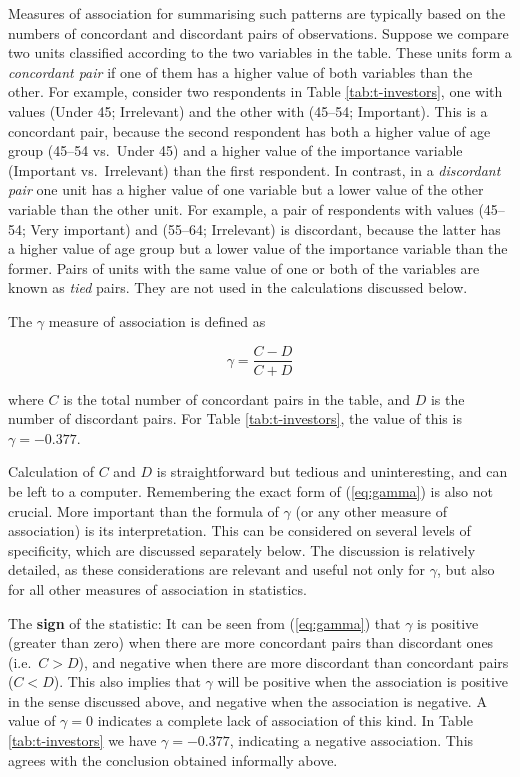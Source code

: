 \documentclass[11pt,a4paper,openany]{book}
\begin{document}
Measures of association for summarising such patterns are typically
based on the numbers of concordant and discordant pairs of observations.
Suppose we compare two units classified according to the two variables
in the table. These units form a \emph{concordant pair} if one of them
has a higher value of both variables than the other. For example,
consider two respondents in Table \ref{tab:t-investors}, one with values
(Under 45; Irrelevant) and the other with (45--54; Important). This is a
concordant pair, because the second respondent has both a higher value
of age group (45--54 vs.~Under 45) and a higher value of the importance
variable (Important vs.~Irrelevant) than the first respondent. In
contrast, in a \emph{discordant pair} one unit has a higher value of one
variable but a lower value of the other variable than the other unit.
For example, a pair of respondents with values (45--54; Very important)
and (55--64; Irrelevant) is discordant, because the latter has a higher
value of age group but a lower value of the importance variable than the
former. Pairs of units with the same value of one or both of the
variables are known as \emph{tied} pairs. They are not used in the
calculations discussed below.

The \(\gamma\) measure of association is defined as

\begin{equation}\gamma=\frac{C-D}{C+D}
\label{eq:gamma}\end{equation}

where \(C\) is the total number of concordant pairs in the table, and
\(D\) is the number of discordant pairs. For Table
\ref{tab:t-investors}, the value of this is \(\gamma=-0.377\).

Calculation of \(C\) and \(D\) is straightforward but tedious and
uninteresting, and can be left to a computer. Remembering the exact form
of (\ref{eq:gamma}) is also not crucial. More important than the formula
of \(\gamma\) (or any other measure of association) is its
interpretation. This can be considered on several levels of specificity,
which are discussed separately below. The discussion is relatively
detailed, as these considerations are relevant and useful not only for
\(\gamma\), but also for all other measures of association in
statistics.

The \textbf{sign} of the statistic: It can be seen from (\ref{eq:gamma})
that \(\gamma\) is positive (greater than zero) when there are more
concordant pairs than discordant ones (i.e.~\(C>D\)), and negative when
there are more discordant than concordant pairs (\(C<D\)). This also
implies that \(\gamma\) will be positive when the association is
positive in the sense discussed above, and negative when the association
is negative. A value of \(\gamma=0\) indicates a complete lack of
association of this kind. In Table \ref{tab:t-investors} we have
\(\gamma=-0.377\), indicating a negative association. This agrees with
the conclusion obtained informally above.
\end{document}
